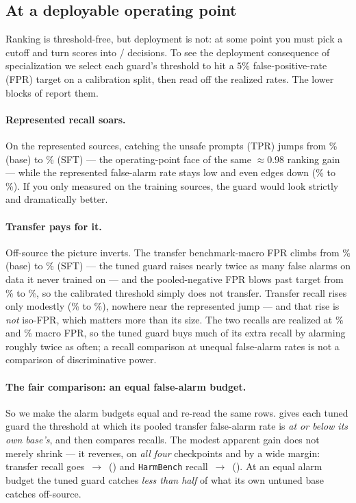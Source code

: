 \subsection{At a deployable operating point}
\label{sec:actI-op}

Ranking is threshold-free, but deployment is not: at some point you must pick a cutoff and turn scores
into / decisions. To see the deployment consequence of specialization we select
each guard's threshold to hit a $5\%$ false-positive-rate (FPR) target on a calibration split, then read
off the realized rates. The lower blocks of  report them.

\paragraph{Represented recall soars.} On the represented sources, catching the unsafe prompts (TPR)
jumps from \RepBaseTPRPct\% (base) to \RepSFTTPRPct\% (SFT) --- the operating-point face of the same
$\approx 0.98$ ranking gain --- while the represented false-alarm rate stays low and even edges down
(\RepBaseFPRPct\% to \RepSFTFPRPct\%). If you only measured on the training sources, the guard would
look strictly and dramatically better.

\paragraph{Transfer pays for it.} Off-source the picture inverts. The transfer benchmark-macro FPR
climbs from \TransferBaseFPRPct\% (base) to \TransferSFTFPRPct\% (SFT) --- the tuned guard raises nearly
twice as many false alarms on data it never trained on --- and the pooled-negative FPR blows past target
from \TransferBasePooledFPRPct\% to \TransferSFTPooledFPRPct\%, so the calibrated threshold simply does
not transfer. Transfer recall rises only modestly (\TransferBaseTPRPct\% to \TransferSFTTPRPct\%),
nowhere near the represented jump --- and that rise is \emph{not} iso-FPR, which matters more than its
size. The two recalls are realized at \TransferBaseFPRPct\% and \TransferSFTFPRPct\% macro FPR, so the
tuned guard buys much of its extra recall by alarming roughly twice as often; a recall comparison at
unequal false-alarm rates is not a comparison of discriminative power.

\paragraph{The fair comparison: an equal false-alarm budget.} So we make the alarm budgets equal and
re-read the same rows.  gives each tuned guard the threshold at which its pooled
transfer false-alarm rate is \emph{at or below its own base's}, and then compares recalls. The modest apparent
gain does not merely shrink --- it reverses, on \emph{all four} checkpoints and by a wide margin: transfer recall goes \MatchedTransferBase{}\,$\to$\,\MatchedTransferSft{}
(\MatchedTransferDelta) and \texttt{HarmBench} recall \MatchedHarmBase{}\,$\to$\,\MatchedHarmSft{}
(\MatchedHarmDelta). At an equal alarm budget the tuned guard catches \emph{less than half} of what its
own untuned base catches off-source.

